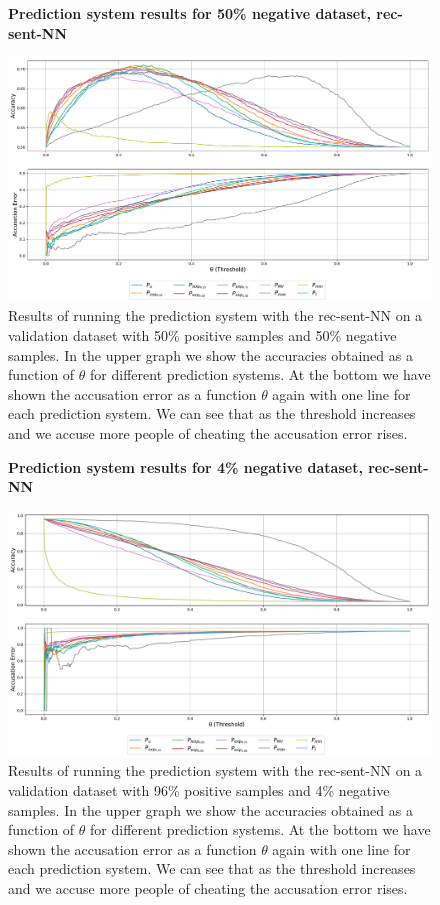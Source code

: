 \begin{figure}
    \centering
    \textbf{Prediction system results for 50\% negative dataset, \gls{rec-sent-NN}}\par\medskip
    \includegraphics[scale=0.33]{./pictures/experiments/rec_sent_nn/prediction_system_50}
    \caption{Results of running the prediction system with the \gls{rec-sent-NN}
    on a validation dataset with 50\% positive samples and 50\% negative
    samples. In the upper graph we show the accuracies obtained as a function
    of $\theta$ for different prediction systems. At the bottom we have shown
    the accusation error as a function $\theta$ again with one line for each
    prediction system. We can see that as the threshold increases and we accuse
    more people of cheating the accusation error rises.}
    \label{fig:rec-sent-NN-pred-50}
\end{figure}

\begin{figure}
    \centering
    \textbf{Prediction system results for 4\% negative dataset, \gls{rec-sent-NN}}\par\medskip
    \includegraphics[scale=0.33]{./pictures/experiments/rec_sent_nn/prediction_system_04}
    \caption{Results of running the prediction system with the \gls{rec-sent-NN}
    on a validation dataset with 96\% positive samples and 4\% negative samples.
    In the upper graph we show the accuracies obtained as a function of $\theta$
    for different prediction systems. At the bottom we have shown the accusation
    error as a function $\theta$ again with one line for each prediction system.
    We can see that as the threshold increases and we accuse more people of
    cheating the accusation error rises.}
    \label{fig:rec-sent-NN-pred-4}
\end{figure}

